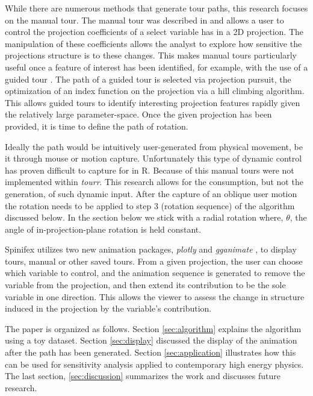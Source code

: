 \documentclass{monashthesis}
\begin{document}
While there are numerous methods that generate tour paths, this research
focuses on the manual tour. The manual tour was described in
\textcite{cook_manual_1997} and allows a user to control the projection
coefficients of a select variable has in a 2D projection. The
manipulation of these coefficients allows the analyst to explore how
sensitive the projections structure is to these changes. This makes
manual tours particularly useful once a feature of interest has been
identified, for example, with the use of a guided tour
\autocite{cook_grand_1995}. The path of a guided tour is selected via
projection pursuit, the optimization of an index function on the
projection via a hill climbing algorithm. This allows guided tours to
identify interesting projection features rapidly given the relatively
large parameter-space. Once the given projection has been provided, it
is time to define the path of rotation.

Ideally the path would be intuitively user-generated from physical
movement, be it through mouse or motion capture. Unfortunately this type
of dynamic control has proven difficult to capture for in R. Because of
this manual tours were not implemented within \emph{tourr}. This
research allows for the consumption, but not the generation, of such
dynamic input. After the capture of an oblique user motion the rotation
needs to be applied to step 3 (rotation sequence) of the algorithm
discussed below. In the section below we stick with a radial rotation
where, \(\theta\), the angle of in-projection-plane rotation is held
constant.

Spinifex utilizes two new animation packages, \emph{plotly}
\autocite{sievert_plotly_2018} and \emph{gganimate}
\autocite{pedersen_gganimate:_2019}, to display tours, manual or other
saved tours. From a given projection, the user can choose which variable
to control, and the animation sequence is generated to remove the
variable from the projection, and then extend its contribution to be the
sole variable in one direction. This allows the viewer to assess the
change in structure induced in the projection by the variable's
contribution.

The paper is organized as follows. Section \ref{sec:algorithm} explains
the algorithm using a toy dataset. Section \ref{sec:display} discussed
the display of the animation after the path has been generated. Section
\ref{sec:application} illustrates how this can be used for sensitivity
analysis applied to contemporary high energy physics. The last section,
\ref{sec:discussion} summarizes the work and discusses future research.
\end{document}
